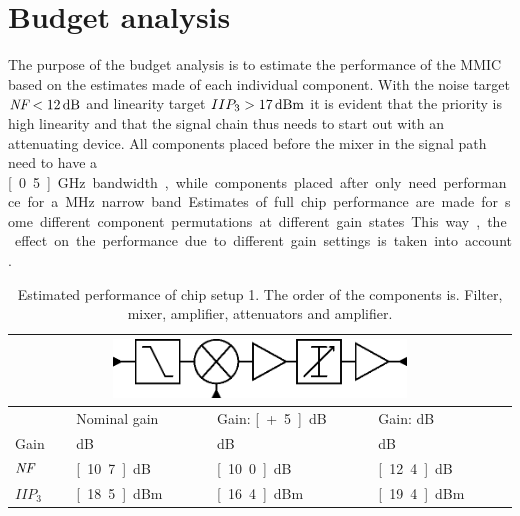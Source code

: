 	\section{Budget analysis}\label{sec:budget_analysis}
		The purpose of the budget analysis is to estimate the performance of the MMIC based on the estimates made of each individual component. With the noise target $\nf<\unit[12]{dB}$ and linearity target $IIP_3>\unit[17]{dBm}$ it is evident that the priority is high linearity and that the signal chain thus needs to start out with an attenuating device. All components placed before the mixer in the signal path need to have a \unit[0.5]{GHz} bandwidth, while components placed after only need performance for a \unit[20]{MHz} narrow band. Estimates of full chip performance are made for some different component permutations at different gain states. This way, the effect on the performance due to different gain settings is taken into account.

		\begin{table}[hpt!]
			\caption[Estimated performance of chip setup 1.]{Estimated performance of chip setup 1. The order of the components is. Filter, mixer, amplifier, attenuators and amplifier.}
			\label{tab:confper1}
			\centering
			\begin{tabular}{ l l l l }
				\multicolumn{4}{c}{\includegraphics[width=0.6\textwidth]{fig/system/sys1}} \\\toprule
				& Nominal gain & Gain: \unit[+5]{dB} & Gain: \unit[-5]{dB} \\\midrule
				Gain & \unit[9]{dB} & \unit[14]{dB} & \unit[4]{dB} \\
				$\emph{NF}$ & \unit[10.7]{dB} & \unit[10.0]{dB} & \unit[12.4]{dB} \\
				$IIP_3$ & \unit[18.5]{dBm} & \unit[16.4]{dBm} & \unit[19.4]{dBm} \\\bottomrule
			\end{tabular}
		\end{table}

